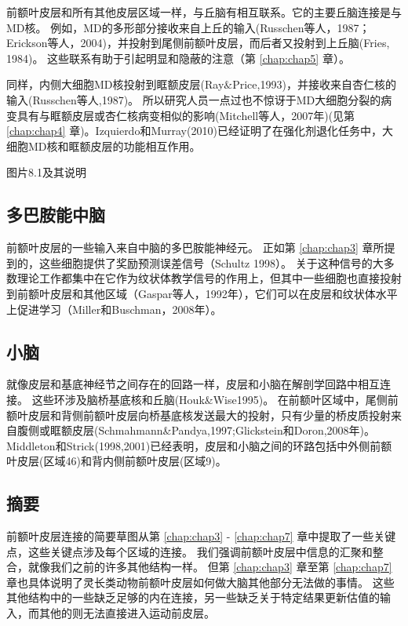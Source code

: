 前额叶皮层和所有其他皮层区域一样，与丘脑有相互联系。它的主要丘脑连接是与MD核。
例如，MD的多形部分接收来自上丘的输入(Russchen等人，1987；Erickson等人，2004)，并投射到尾侧前额叶皮层，而后者又投射到上丘脑(Fries, 1984)。
这些联系有助于引起明显和隐蔽的注意（第 \ref{chap:chap5} 章）。
\par


同样，内侧大细胞MD核投射到眶额皮层(Ray$\&$Price,1993)，并接收来自杏仁核的输入(Russchen等人,1987)。
所以研究人员一点过也不惊讶于MD大细胞分裂的病变具有与眶额皮层或杏仁核病变相似的影响(Mitchell等人，2007年)(见第 \ref{chap:chap4} 章)。Izquierdo和Murray(2010)已经证明了在强化剂退化任务中，大细胞MD核和眶额皮层的功能相互作用。


图片8.1及其说明



\subsection{多巴胺能中脑}
\par

前额叶皮层的一些输入来自中脑的多巴胺能神经元。
正如第 \ref{chap:chap3} 章所提到的，这些细胞提供了奖励预测误差信号（Schultz 1998）。
关于这种信号的大多数理论工作都集中在它作为纹状体教学信号的作用上，但其中一些细胞也直接投射到前额叶皮层和其他区域（Gaspar等人，1992年），它们可以在皮层和纹状体水平上促进学习（Miller和Buschman，2008年）。



\subsection{小脑}
\par

就像皮层和基底神经节之间存在的回路一样，皮层和小脑在解剖学回路中相互连接。
这些环涉及脑桥基底核和丘脑(Houk\&Wise1995)。
在前额叶区域中，尾侧前额叶皮层和背侧前额叶皮层向桥基底核发送最大的投射，只有少量的桥皮质投射来自腹侧或眶额皮层(Schmahmann\&Pandya,1997;Glickstein和Doron,2008年)。
Middleton和Strick(1998,2001)已经表明，皮层和小脑之间的环路包括中外侧前额叶皮层(区域46)和背内侧前额叶皮层(区域9)。



\subsection{摘要}
\par

前额叶皮层连接的简要草图从第 \ref{chap:chap3} - \ref{chap:chap7} 章中提取了一些关键点，这些关键点涉及每个区域的连接。
我们强调前额叶皮层中信息的汇聚和整合，就像我们之前的许多其他结构一样。
但第 \ref{chap:chap3} 章至第 \ref{chap:chap7} 章也具体说明了灵长类动物前额叶皮层如何做大脑其他部分无法做的事情。
这些其他结构中的一些缺乏足够的内在连接，另一些缺乏关于特定结果更新估值的输入，而其他的则无法直接进入运动前皮层。
\par


